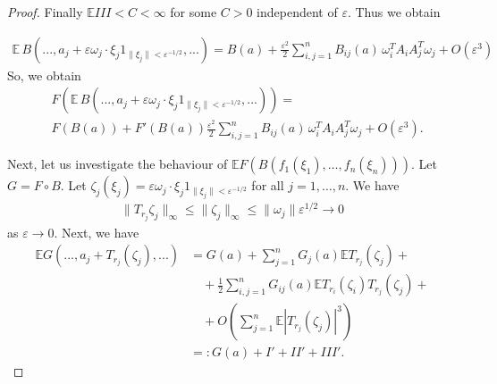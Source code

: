 \documentclass[9pt, a4paper]{amsart}
\newcommand{\1}{{\chi_{}}}%
\numberwithin{equation}{section}
\begin{document}
\begin{proof}
Finally $\mathbb{E} III <C<\infty$ for some $C >0$ independent of $\varepsilon$. Thus we obtain 

\begin{align*}
   \mathbb{E}\,  B(...,a_{j} + \varepsilon \omega_{j} \cdot \xi_{j} 1_{\|\xi_{j}\|<\varepsilon^{-1/2}},...) = B(a) + \frac{\varepsilon^{2}}{2}\sum_{i,j=1}^{n}B_{ij}(a)\, \omega_{i}^{T}A_{i}A_{j}^{T}\omega_{j} + O(\varepsilon^{3})
\end{align*}
So, we obtain 
\begin{align*}
    &F( \mathbb{E}\,  B(...,a_{j} + \varepsilon \omega_{j} \cdot \xi_{j} 1_{\|\xi_{j}\|<\varepsilon^{-1/2}},...)) = \\
    &F(B(a))+F'(B(a))\frac{\varepsilon^{2}}{2}\sum_{i,j=1}^{n}B_{ij}(a)\, \omega_{i}^{T}A_{i}A_{j}^{T}\omega_{j}+O(\varepsilon^{3}).
\end{align*}


Next, let us investigate the behaviour of $\mathbb{E} F(B(f_{1}(\xi_{1}), \ldots, f_{n}(\xi_{n})))$. Let $G = F\circ B$. Let $\zeta_{j}(\xi_{j}) =\varepsilon \omega_{j} \cdot \xi_{j} 1_{\|\xi_{j}\|<\varepsilon^{-1/2}}$ for all $j=1, \ldots, n$. We have 
\begin{align*}
    \| T_{r_{j}} \zeta_{j} \|_{\infty} \leq \|\zeta_{j}\|_{\infty} \leq \|\omega_{j}\| \varepsilon^{1/2} \to 0
\end{align*}
as $\varepsilon \to 0$. 
Next, we have 
\begin{align*}
    \mathbb{E}G(...,a_{j}+T_{r_{j}}(\zeta_{j}),...)&=G(a)+ \sum_{j=1}^{n}G_{j}(a) \mathbb{E}T_{r_{j}}(\zeta_{j})+\\
    &\quad +\frac{1}{2}\sum_{i,j=1}^{n} G_{ij}(a)  \mathbb{E}T_{r_{i}}(\zeta_{i}) T_{r_{j}}(\zeta_{j})+\\
    &\quad +O\left(\sum_{j=1}^{n} \mathbb{E}|T_{r_{j}}(\zeta_{j})|^{3} \right)\\
    &=: G(a)+I'+II'+III'. 
\end{align*}


\end{proof}
\end{document}

